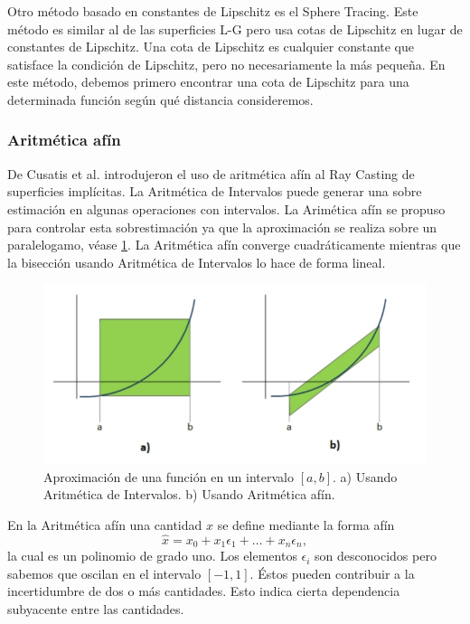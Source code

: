 Otro método basado en constantes de Lipschitz es el Sphere Tracing\cite{Hart96}. Este método es similar al de las superficies L-G pero usa cotas de Lipschitz en lugar de constantes de Lipschitz. Una cota de Lipschitz es cualquier constante que satisface la condición de Lipschitz, pero no necesariamente la más pequeña. En este método, debemos primero encontrar una cota de Lipschitz para una determinada función según qué distancia consideremos.

\subsubsection{Aritmética afín}

De Cusatis et al.\cite{Cusatis99} introdujeron el uso de aritmética afín al Ray Casting de superficies implícitas. La Aritmética de Intervalos puede generar una sobre estimación en algunas operaciones con intervalos. La Arimética afín se propuso para controlar  esta sobrestimación ya que la aproximación se realiza sobre un paralelogamo, véase \ref{florez413}. La Aritmética afín converge cuadráticamente mientras que la bisección usando Aritmética de Intervalos lo hace de forma lineal.
\begin{figure}[h]
	\centering
	\includegraphics[scale=0.5]{images/florez10.png}
	\caption{Aproximación de una función en un intervalo $[a,b]$. a) Usando Aritmética de Intervalos. b) Usando Aritmética afín.}
	\label{florez413}
\end{figure}

En la Aritmética afín una cantidad $x$ se define mediante la forma afín
\begin{equation}
\hat{x} = x_0 + x_1 \epsilon_1 + \dots + x_n \epsilon_n,
\nonumber
\end{equation}
la cual es un polinomio de grado uno. Los elementos $\epsilon_i$ son desconocidos pero sabemos que oscilan en el intervalo $[-1,1]$. Éstos pueden contribuir a la incertidumbre de dos o más cantidades. Esto indica cierta dependencia subyacente entre las cantidades.

